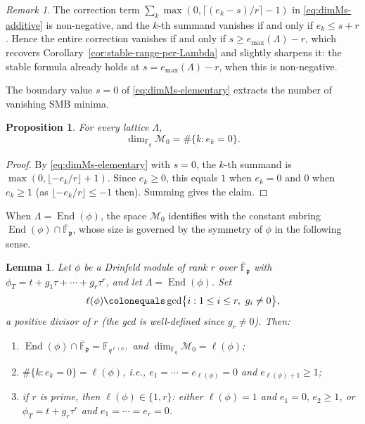 \documentclass[12pt]{amsart}
\newtheorem{prop}[thm]{Proposition}
\newtheorem{lem}[thm]{Lemma}
\theoremstyle{definition}
\theoremstyle{remark}
\newtheorem{rem}[thm]{Remark}
\numberwithin{equation}{section}
\numberwithin{thm}{section}
\DeclareMathOperator{\End}{End}
\newcommand{\fp}{\mathfrak{p}}
\newcommand{\cM}{\mathcal{M}}
\newcommand{\F}{\mathbb{F}}
\newcommand{\oF}{\overline{\F}}
\newcommand{\La}{\Lambda}
\begin{document}
	\begin{rem}
		The correction term $\sum_k\max(0,\lceil(e_k-s)/r\rceil - 1)$ in \eqref{eq:dimMs-additive} is non-negative, and the $k$-th summand vanishes if and only if $e_k \leq s + r$. Hence the entire correction vanishes if and only if $s \geq e_{\max}(\La) - r$, which recovers Corollary~\ref{cor:stable-range-per-Lambda} and slightly sharpens it: the stable formula already holds at $s = e_{\max}(\La) - r$, when this is non-negative.
	\end{rem}
	
	The boundary value $s = 0$ of \eqref{eq:dimMs-elementary} extracts the number of vanishing SMB minima.
	
	\begin{prop}\label{prop:m0-count}
		For every lattice $\La$,
		\[
		\dim_{\F_q}\cM_0 = \#\{k : e_k = 0\}.
		\]
	\end{prop}
	
	\begin{proof}
		By \eqref{eq:dimMs-elementary} with $s = 0$, the $k$-th summand is $\max(0, \lfloor -e_k/r\rfloor + 1)$. Since $e_k \geq 0$, this equals $1$ when $e_k = 0$ and $0$ when $e_k \geq 1$ (as $\lfloor -e_k/r\rfloor \leq -1$ then). Summing gives the claim.
	\end{proof}
	
	When $\La = \End(\phi)$, the space $\cM_0$ identifies with the constant subring $\End(\phi)\cap \oF_\fp$, whose size is governed by the symmetry of $\phi$ in the following sense.
	
	\begin{lem}\label{lem:e1-zero}
		Let $\phi$ be a Drinfeld module of rank $r$ over $\oF_\fp$ with $\phi_T = t + g_1\tau + \cdots + g_r\tau^r$, and let $\La = \End(\phi)$. Set
		\[
		\ell(\phi) \colonequals \gcd\bigl\{i : 1 \leq i \leq r,\ g_i \neq 0\bigr\},
		\]
		a positive divisor of $r$ (the gcd is well-defined since $g_r \neq 0$). Then:
		\begin{enumerate}
			\item[\textup{(1)}] $\End(\phi) \cap \oF_\fp = \F_{q^{\ell(\phi)}}$ and $\dim_{\F_q}\cM_0 = \ell(\phi)$;
			\item[\textup{(2)}] $\#\{k : e_k = 0\} = \ell(\phi)$, i.e., $e_1 = \cdots = e_{\ell(\phi)} = 0$ and $e_{\ell(\phi)+1} \geq 1$;
			\item[\textup{(3)}] if $r$ is prime, then $\ell(\phi) \in \{1, r\}$: either $\ell(\phi) = 1$ and $e_1 = 0,\, e_2 \geq 1$, or $\phi_T = t + g_r\tau^r$ and $e_1 = \cdots = e_r = 0$.
		\end{enumerate}
	\end{lem}
	
\end{document}
